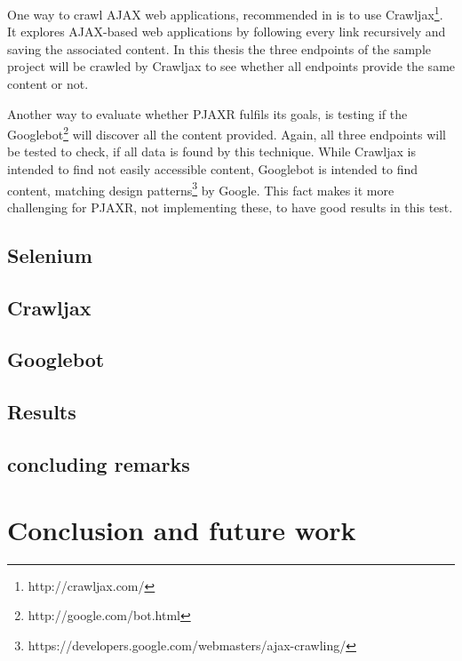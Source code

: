 \documentclass[f,bachelor,binding,twoside,palatino]{WeSTthesis}
\def \ajax {AJAX}
\def \pjaxr {PJAXR}
\begin{document}
One way to crawl \ajax{} web applications, recommended in \cite{crawljax:tweb12} is to use Crawljax\footnote{http://crawljax.com/}. 
It explores \ajax{}-based web applications by following every link recursively and saving the associated content. In this thesis the three endpoints of the sample project will be crawled by Crawljax to see whether all endpoints provide the same content or not.

Another way to evaluate whether \pjaxr{} fulfils its goals, is testing if the Googlebot\footnote{http://google.com/bot.html} will discover all the content provided.
Again, all three endpoints will be tested to check, if all data is found by this technique.
While Crawljax is intended to find not easily accessible content, Googlebot is intended to find content, matching design patterns\footnote{https://developers.google.com/webmasters/ajax-crawling/} by Google. This fact makes it more challenging for \pjaxr{}, not implementing these, to have good results in this test.

\subsection{Selenium}

\subsection{Crawljax}

\subsection{Googlebot}

\subsection{Results}

\subsection{concluding remarks}

\section{Conclusion and future work}
\end{document}
